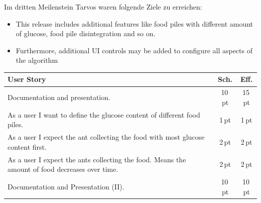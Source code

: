 Im dritten Meilenstein Tarvos waren folgende Ziele zu erreichen:

\begin{itemize}[noitemsep]
\item This release includes additional features like food piles with different amount of glucose, food pile disintegration and so on.
\item Furthermore, additional UI controls may be added to configure all aspects of the algorithm
\end{itemize}


\begin{table}[H]
\small\sffamily\renewcommand{\arraystretch}{1.5}
\begin{tabular}{| p{12cm} | c | c |}
  \hline
  \bfseries{User Story} & \bfseries{Sch.} & \bfseries{Eff.}  \\
  \hline
  Documentation and presentation. & 10\,pt & 15\,pt \\
  \hline
  As a user I want to define the glucose content of different food piles. & 1\,pt &1\,pt \\
  \hline
  As a user I expect the ant collecting the food with most glucose content first. & 2\,pt &2\,pt \\
  \hline
  As a user I expect the ants collecting the food. Means the amount of food decreases over time. & 2\,pt & 2\,pt \\
  \hline
  Documentation and Presentation (II). & 10\,pt & 10\,pt \\
  \hline
\end{tabular}
\end{table}


